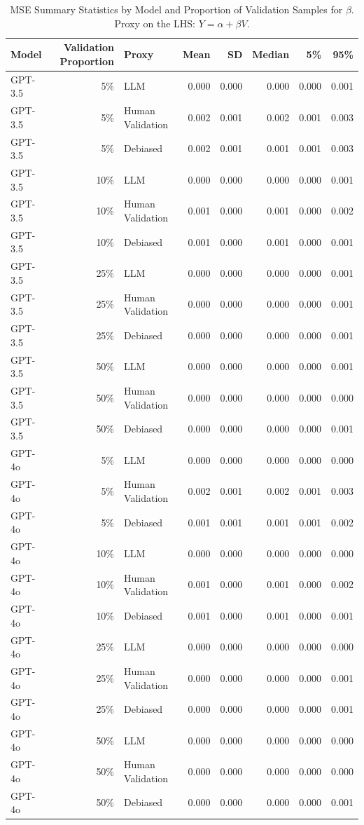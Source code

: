 \begin{table}

\caption{\label{tab:unnamed-chunk-2}MSE Summary Statistics by Model and Proportion of Validation Samples for $\beta$. Proxy on the LHS: $Y = \alpha + \beta V$.}
\centering
\begin{tabular}[t]{lrlrrrrr}
\toprule
Model & Validation Proportion & Proxy & Mean & SD & Median & 5\% & 95\%\\
\midrule
GPT-3.5 & 5\% & LLM & 0.000 & 0.000 & 0.000 & 0.000 & 0.001\\
GPT-3.5 & 5\% & Human Validation & 0.002 & 0.001 & 0.002 & 0.001 & 0.003\\
GPT-3.5 & 5\% & Debiased & 0.002 & 0.001 & 0.001 & 0.001 & 0.003\\
GPT-3.5 & 10\% & LLM & 0.000 & 0.000 & 0.000 & 0.000 & 0.001\\
GPT-3.5 & 10\% & Human Validation & 0.001 & 0.000 & 0.001 & 0.000 & 0.002\\
GPT-3.5 & 10\% & Debiased & 0.001 & 0.000 & 0.001 & 0.000 & 0.001\\
GPT-3.5 & 25\% & LLM & 0.000 & 0.000 & 0.000 & 0.000 & 0.001\\
GPT-3.5 & 25\% & Human Validation & 0.000 & 0.000 & 0.000 & 0.000 & 0.001\\
GPT-3.5 & 25\% & Debiased & 0.000 & 0.000 & 0.000 & 0.000 & 0.001\\
GPT-3.5 & 50\% & LLM & 0.000 & 0.000 & 0.000 & 0.000 & 0.001\\
GPT-3.5 & 50\% & Human Validation & 0.000 & 0.000 & 0.000 & 0.000 & 0.000\\
GPT-3.5 & 50\% & Debiased & 0.000 & 0.000 & 0.000 & 0.000 & 0.001\\
GPT-4o & 5\% & LLM & 0.000 & 0.000 & 0.000 & 0.000 & 0.000\\
GPT-4o & 5\% & Human Validation & 0.002 & 0.001 & 0.002 & 0.001 & 0.003\\
GPT-4o & 5\% & Debiased & 0.001 & 0.001 & 0.001 & 0.001 & 0.002\\
GPT-4o & 10\% & LLM & 0.000 & 0.000 & 0.000 & 0.000 & 0.000\\
GPT-4o & 10\% & Human Validation & 0.001 & 0.000 & 0.001 & 0.000 & 0.002\\
GPT-4o & 10\% & Debiased & 0.001 & 0.000 & 0.001 & 0.000 & 0.001\\
GPT-4o & 25\% & LLM & 0.000 & 0.000 & 0.000 & 0.000 & 0.000\\
GPT-4o & 25\% & Human Validation & 0.000 & 0.000 & 0.000 & 0.000 & 0.001\\
GPT-4o & 25\% & Debiased & 0.000 & 0.000 & 0.000 & 0.000 & 0.001\\
GPT-4o & 50\% & LLM & 0.000 & 0.000 & 0.000 & 0.000 & 0.000\\
GPT-4o & 50\% & Human Validation & 0.000 & 0.000 & 0.000 & 0.000 & 0.000\\
GPT-4o & 50\% & Debiased & 0.000 & 0.000 & 0.000 & 0.000 & 0.001\\
\bottomrule
\end{tabular}
\end{table}
